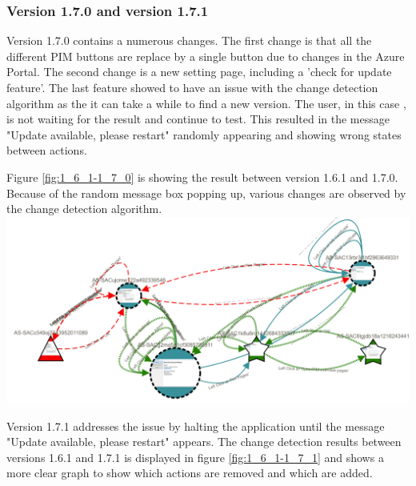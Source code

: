 \subsubsection{Version 1.7.0 and version 1.7.1}
Version 1.7.0 contains a numerous changes. The first change is that all the different PIM buttons are replace by a single button due to changes in the Azure Portal. The second change is a new setting page, including a 'check for update feature'. The last feature showed to have an issue with the change detection algorithm as the it can take a while to find a new version. The user, in this case \testar, is not waiting for the result and continue to test. This resulted in the message "Update available, please restart" randomly appearing and showing wrong states between actions. 

Figure \ref{fig:1_6_1-1_7_0} is showing the result between version 1.6.1 and 1.7.0. Because of the random message box popping up, various changes are observed by the change detection algorithm. 
\\
\begingroup
\captionsetup{type=figure}
\includegraphics[scale=0.3]{images/6-Experiment/1_6_1-1_7_0.png}
\label{fig:1_6_1-1_7_0}
\endgroup

Version 1.7.1 addresses the issue by halting the application until the message "Update available, please restart" appears.  The change detection results between versions 1.6.1 and 1.7.1 is displayed in figure \ref{fig:1_6_1-1_7_1} and shows a more clear graph to show which actions are removed and which are added.

